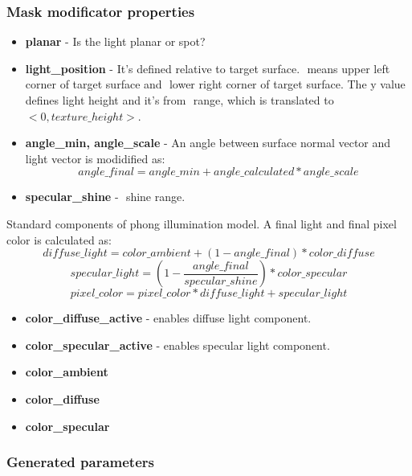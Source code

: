 \documentclass[9pt]{article}
\begin{document}
\subsubsection*{Mask modificator properties}
\begin{itemize}
\item{\bf planar} - Is the light planar or spot?
\item{\bf light\_position} - It's defined relative to target surface. 
\begin{math}<-1,y,-1>\end{math} means upper left corner of target surface and \begin{math}<1,y,1>\end{math} lower right
corner of target surface. The y value defines light height and it's from \begin{math}<0,1>\end{math} range, 
which is translated to \begin{math}<0,texture\_height>\end{math}.
\item{\bf angle\_min, angle\_scale} - An angle between surface normal vector and light vector
is modidified as:
\[
angle\_final = angle\_min + angle\_calculated * angle\_scale
\]
\item{\bf specular\_shine} - \begin{math}<0,1>\end{math} shine range.
\end{itemize}
Standard components of phong illumination model. A final light and final pixel color is calculated as:
\[
diffuse\_light = color\_ambient + (1 - angle\_final) * color\_diffuse
\]
\[
specular\_light = (1 - \frac{angle\_final}{specular\_shine}) * color\_specular
\]
\[
pixel\_color = pixel\_color * diffuse\_light + specular\_light
\]
\begin{itemize}
\item{\bf color\_diffuse\_active} - enables diffuse light component.
\item{\bf color\_specular\_active} - enables specular light component.
\item{\bf color\_ambient}
\item{\bf color\_diffuse}
\item{\bf color\_specular}
\end{itemize}

\subsubsection*{Generated parameters}
\end{document}
